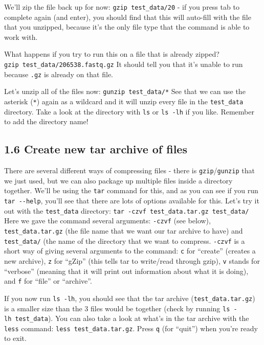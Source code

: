 \documentclass[
]{book}
\begin{document}
We'll zip the file back up for now: \texttt{gzip\ test\_data/20} - if you press tab to complete again (and enter), you should find that this will auto-fill with the file that you unzipped, because it's the only file type that the command is able to work with.

What happens if you try to run this on a file that is already zipped? \texttt{gzip\ test\_data/206538.fastq.gz} It should tell you that it's unable to run because \texttt{.gz} is already on that file.

Let's unzip all of the files now: \texttt{gunzip\ test\_data/*}
See that we can use the asterisk (\texttt{*}) again as a wildcard and it will unzip every file in the \texttt{test\_data} directory. Take a look at the directory with \texttt{ls} or \texttt{ls\ -lh} if you like. Remember to add the directory name!

\subsection{1.6 Create new tar archive of files}\label{create-new-tar-archive-of-files}

There are several different ways of compressing files - there is \texttt{gzip}/\texttt{gunzip} that we just used, but we can also package up multiple files inside a directory together. We'll be using the \texttt{tar} command for this, and as you can see if you run \texttt{tar\ -\/-help}, you'll see that there are lots of options available for this. Let's try it out with the \texttt{test\_data} directory:
\texttt{tar\ -czvf\ test\_data.tar.gz\ test\_data/}
Here we gave the command several arguments: \texttt{-czvf} (see below), \texttt{test\_data.tar.gz} (the file name that we want our tar archive to have) and \texttt{test\_data/} (the name of the directory that we want to compress.
\texttt{-czvf} is a short way of giving several arguments to the command: \texttt{c} for ``create'' (creates a new archive), \texttt{z} for ``gZip'' (this tells tar to write/read through gzip), \texttt{v} stands for ``verbose'' (meaning that it will print out information about what it is doing), and \texttt{f} for ``file'' or ``archive''.

If you now run \texttt{ls\ -lh}, you should see that the tar archive (\texttt{test\_data.tar.gz}) is a smaller size than the 3 files would be together (check by running \texttt{ls\ -lh\ test\_data}). You can also take a look at what's in the tar archive with the \texttt{less} command: \texttt{less\ test\_data.tar.gz}. Press \texttt{q} (for ``quit'') when you're ready to exit.
\end{document}
